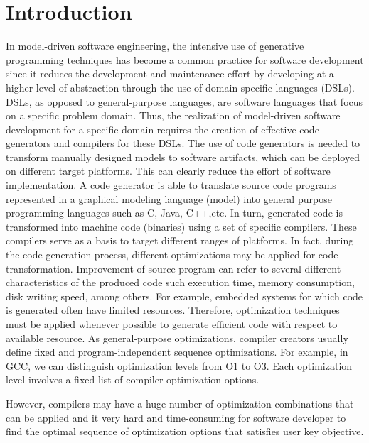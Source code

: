 \section{Introduction}
In model-driven software engineering, the intensive use of generative programming techniques has become a common practice for software development since it reduces the development and maintenance effort by developing at a higher-level of abstraction through the use of domain-specific languages (DSLs). 
DSLs, as opposed to general-purpose languages, are software languages that focus on a specific problem domain. Thus, the realization of model-driven software development for a specific domain requires the creation of effective code generators and compilers for these DSLs.
The use of code generators is needed to transform manually designed models to software artifacts, which can be deployed on different target platforms. This can clearly reduce the effort of software implementation. A code generator is able to translate source code programs represented in a graphical modeling language (model) into general purpose programming languages such as C, Java, C++,etc. In turn, generated code is transformed into machine code (binaries) using a set of specific compilers.
These compilers serve as a basis to target different ranges of platforms. 
In fact, during the code generation process, different optimizations may be applied for code transformation. Improvement of source program can refer to several different characteristics of the produced code such execution time, memory consumption, disk writing speed, among others.
For example, embedded systems for which code is generated often have limited resources. Therefore, optimization techniques must be applied whenever possible to generate efficient code with respect to available resource. 
As general-purpose optimizations, compiler creators usually
define fixed and program-independent sequence optimizations.
For example, in GCC, we can distinguish optimization levels
from O1 to O3. Each optimization level involves a fixed list of compiler optimization options. 

However, compilers may have a huge number of optimization
combinations that can be applied and it very hard and time-consuming for software developer to find the
optimal sequence of optimization options that satisfies user
key objective. 

